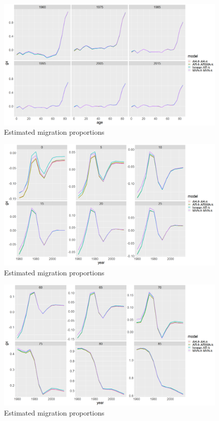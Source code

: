 \documentclass[12pt,a4paper]{article}
\begin{document}
\newpage
\begin{figure}[H]
\includegraphics[width = \linewidth]{Burkina Faso/6/period mig.png} 	
\caption{Estimated migration proportions}
\end{figure}
\begin{figure}[H]
\includegraphics[width = \linewidth]{Burkina Faso/6/age mig.png}
\caption{Estimated migration proportions}
\end{figure}
\begin{figure}[H]
\includegraphics[width = \linewidth]{Burkina Faso/6/age mig 2.png}
\caption{Estimated migration proportions}
\end{figure}
\end{document}
